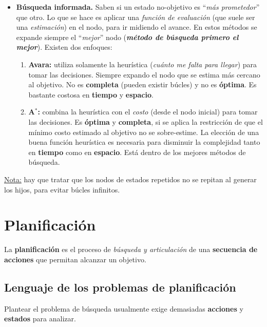 \documentclass[10pt,a4paper]{article}
\begin{document}
\begin{itemize}
\item \textbf{Búsqueda informada.} Saben si un estado no-objetivo es ``\textit{más prometedor}'' que otro. Lo que se hace es aplicar una \textit{función de evaluación} (que suele ser una \textit{estimación}) en el nodo, para ir midiendo el avance. En estos métodos se expande siempre el ``\textit{mejor}'' nodo (\textbf{\textit{método de búsqueda primero el mejor}}). Existen dos enfoques:
\begin{enumerate}
\item \textbf{Avara:} utiliza solamente la heurística (\textit{cuánto me falta para llegar}) para tomar las decisiones. Siempre expando el nodo que se estima más cercano al objetivo. No es \textbf{completa} (pueden existir búcles) y no es \textbf{óptima}. Es bastante costosa en \textbf{tiempo} y \textbf{espacio}.
\item \textbf{A$^*$:} combina la heurística con el \textit{costo} (desde el nodo inicial) para tomar las decisiones. Es \textbf{óptima} y \textbf{completa}, si se aplica la restricción de que el mínimo costo estimado al objetivo no se sobre-estime. La elección de una buena función heurística es necesaria para disminuir la complejidad tanto en \textbf{tiempo} como en \textbf{espacio}. Está dentro de los mejores métodos de búsqueda.
\end{enumerate}
\end{itemize}

\underline{Nota:} hay que tratar que los nodos de estados repetidos no se repitan al generar los hijos, para evitar búcles infinitos.

\section{Planificación}

La \textbf{planificación} es el proceso de \textit{búsqueda y articulación} de una \textbf{secuencia de acciones} que permitan alcanzar un objetivo.

\subsection{Lenguaje de los problemas de planificación}

Plantear el problema de búsqueda usualmente exige demasiadas \textbf{acciones} y \textbf{estados} para analizar.
\end{document}
